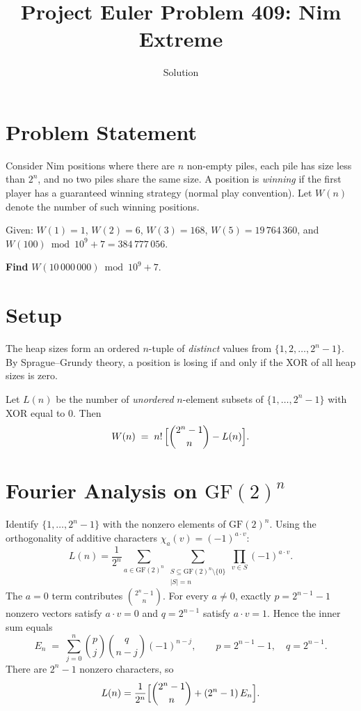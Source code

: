 \documentclass[11pt]{article}
\title{Project Euler Problem 409: Nim Extreme}
\author{Solution}
\date{}
\newcommand{\GF}{\mathrm{GF}}
\begin{document}
\maketitle

\section{Problem Statement}

Consider Nim positions where there are $n$ non-empty piles, each pile has size
less than $2^n$, and no two piles share the same size. A position is
\emph{winning} if the first player has a guaranteed winning strategy (normal
play convention). Let $W(n)$ denote the number of such winning positions.

Given: $W(1)=1$, $W(2)=6$, $W(3)=168$, $W(5)=19\,764\,360$, and
$W(100) \bmod 10^9+7 = 384\,777\,056$.

\medskip\noindent\textbf{Find} $W(10\,000\,000) \bmod 10^9+7$.

\section{Setup}

The heap sizes form an ordered $n$-tuple of \emph{distinct} values from
$\{1, 2, \ldots, 2^n - 1\}$.  By Sprague--Grundy theory, a position is losing
if and only if the XOR of all heap sizes is zero.

Let $L(n)$ be the number of \emph{unordered} $n$-element subsets of
$\{1,\ldots,2^n-1\}$ with XOR equal to $0$.  Then
\[
  W(n) \;=\; n!\,\Bigl[\binom{2^n-1}{n} - L(n)\Bigr].
\]

\section{Fourier Analysis on $\GF(2)^n$}

Identify $\{1,\ldots,2^n-1\}$ with the nonzero elements of $\GF(2)^n$.
Using the orthogonality of additive characters $\chi_a(v) = (-1)^{a \cdot v}$:
\[
  L(n) = \frac{1}{2^n}\sum_{a \in \GF(2)^n}
         \sum_{\substack{S \subseteq \GF(2)^n\setminus\{0\}\\|S|=n}}
         \prod_{v \in S} (-1)^{a \cdot v}.
\]
The $a=0$ term contributes $\binom{2^n-1}{n}$.  For every $a \neq 0$, exactly
$p = 2^{n-1}-1$ nonzero vectors satisfy $a\cdot v = 0$ and $q = 2^{n-1}$
satisfy $a\cdot v = 1$.  Hence the inner sum equals
\[
  E_n \;=\; \sum_{j=0}^{n} \binom{p}{j}\binom{q}{n-j}(-1)^{n-j},
  \qquad p = 2^{n-1}-1,\quad q = 2^{n-1}.
\]
There are $2^n-1$ nonzero characters, so
\[
  L(n) = \frac{1}{2^n}\Bigl[\binom{2^n-1}{n} + (2^n-1)\,E_n\Bigr].
\]
\end{document}
